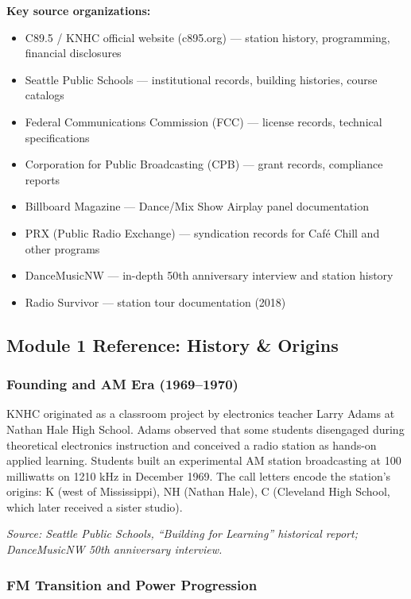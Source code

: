 \documentclass[11pt,letterpaper]{article}
\begin{document}
\textbf{Key source organizations:}
\begin{itemize}[leftmargin=2em]
\item C89.5 / KNHC official website (c895.org) --- station history, programming, financial disclosures
\item Seattle Public Schools --- institutional records, building histories, course catalogs
\item Federal Communications Commission (FCC) --- license records, technical specifications
\item Corporation for Public Broadcasting (CPB) --- grant records, compliance reports
\item Billboard Magazine --- Dance/Mix Show Airplay panel documentation
\item PRX (Public Radio Exchange) --- syndication records for Café Chill and other programs
\item DanceMusicNW --- in-depth 50th anniversary interview and station history
\item Radio Survivor --- station tour documentation (2018)
\end{itemize}

\subsection{Module 1 Reference: History \& Origins}

\subsubsection{Founding and AM Era (1969--1970)}

KNHC originated as a classroom project by electronics teacher Larry Adams at Nathan Hale High School. Adams observed that some students disengaged during theoretical electronics instruction and conceived a radio station as hands-on applied learning. Students built an experimental AM station broadcasting at 100 milliwatts on 1210 kHz in December 1969. The call letters encode the station's origins: K (west of Mississippi), NH (Nathan Hale), C (Cleveland High School, which later received a sister studio).

\textit{Source: Seattle Public Schools, ``Building for Learning'' historical report; DanceMusicNW 50th anniversary interview.}

\subsubsection{FM Transition and Power Progression}
\end{document}
